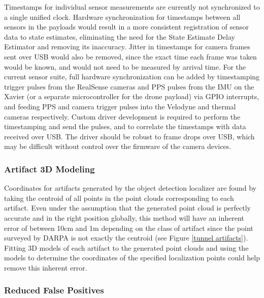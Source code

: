 Timestamps for individual sensor measurements are currently not synchronized to a single unified clock. Hardware synchronization for timestamps between all sensors in the payloads would result in a more consistent registration of sensor data to state estimates, eliminating the need for the State Estimate Delay Estimator and removing its inaccuracy. Jitter in timestamps for camera frames sent over USB would also be removed, since the exact time each frame was taken would be known, and would not need to be measured by arrival time. For the current sensor suite, full hardware synchronization can be added by timestamping trigger pulses from the RealSense cameras and PPS pulses from the IMU on the Xavier (or a separate microcontroller for the drone payload) via GPIO interrupts, and feeding PPS and camera trigger pulses into the Velodyne and thermal cameras respectively. Custom driver development is required to perform the timestamping and send the pulses, and to correlate the timestamps with data received over USB. The driver should be robust to frame drops over USB, which may be difficult without control over the firmware of the camera devices.

\subsubsection{Artifact 3D Modeling}

Coordinates for artifacts generated by the object detection localizer are found by taking the centroid of all points in the point clouds corresponding to each artifact. Even under the assumption that the generated point cloud is perfectly accurate and in the right position globally, this method will have an inherent error of between 10cm and 1m depending on the class of artifact since the point surveyed by DARPA is not exactly the centroid (see Figure \ref{tunnel artifacts}). Fitting 3D models of each artifact to the generated point clouds and using the models to determine the coordinates of the specified localization points could help remove this inherent error.

\subsubsection{Reduced False Positives}

